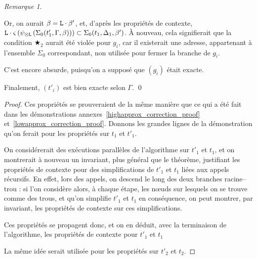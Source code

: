\documentclass[11pt,a4paper]{article}
\theoremstyle{plain}
\theoremstyle{definition}
\theoremstyle{remark}
\newtheorem{remark}{Remarque}
\newcommand*{\tensor}{\otimes}
\newcommand*{\someperm}{\varsigma}
\newcommand*{\sequent}{\Gamma}
\newcommand*{\sequentbis}{\Delta}
\newcommand*{\Left}{\textnormal{\texttt{L}}}
\newcommand*{\lowapprox}{\ensuremath{\Sigma_0}}
\newcommand*{\exactcondbis}{\bigstar_2}
\begin{document}
\begin{remark}
\begin{itemize}
            Or, on aurait $\beta = \Left \cdot \beta'$, et, d'après les propriétés de contexte, $\Left \cdot \someperm \left( \psi_{\tensor\Left} \left(\lowapprox(t'_1, \sequent, \beta)\right) \right) \subset \lowapprox(t_1, \sequentbis_1, \beta')$. À nouveau, cela signifierait que la condition $\exactcondbis$ aurait été violée pour $g_i$, car il existerait une adresse, appartenant à l'ensemble $\lowapprox$ correspondant, non utilisée pour fermer la branche de $g_i$. 
            
            C'est encore absurde, puisqu'on a supposé que $(g_i)$ était exacte.
    \end{itemize}

    Finalement, $(t'_i)$ est bien exacte selon $\sequent$. \qed
\end{remark}

\begin{proof}
    Ces propriétés se prouveraient de la même manière que ce qui a été fait dans les démonstrations annexes~\ref{highapprox_correction_proof} et~\ref{lowapprox_correction_proof}. Donnons les grandes lignes de la démonstration qu'on ferait pour les propriétés sur $t_1$ et $t'_1$.
    
    On considérerait des exécutions parallèles de l'algorithme sur $t'_1$ et $t_1$, et on montrerait à nouveau un invariant, plus général que le théorème, justifiant les propriétés de contexte pour des simplifications de $t'_1$ et $t_1$ liées aux appels récursifs. En effet, lors des appels, on descend le long des deux branches racine--trou : si l'on considère alors, à chaque étape, les n\oe uds sur lesquels on se trouve comme des trous, et qu'on simplifie $t'_1$ et $t_1$ en conséquence, on peut montrer, par invariant, les propriétés de contexte sur ces simplifications.

    Ces propriétés se propagent donc, et on en déduit, avec la terminaison de l'algorithme, les propriétés de contexte pour $t'_1$ et $t_1$
    
    La même idée serait utilisée pour les propriétés sur $t'_2$ et $t_2$.
\end{proof}
\end{document}
